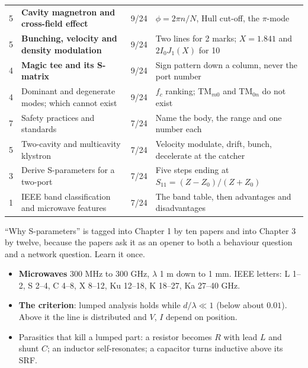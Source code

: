 \begin{tabularx}{\textwidth}{@{}L{0.7cm}L{5.5cm}L{1.3cm}X@{}}
5 & \textbf{Cavity magnetron and cross-field effect} & 9/24 & $\phi = 2\pi n/N$, Hull cut-off, the $\pi$-mode \\
5 & \textbf{Bunching, velocity and density modulation} & 9/24 & Two lines for 2 marks; $X=1.841$ and $2I_0J_1(X)$ for 10 \\
4 & \textbf{Magic tee and its S-matrix} & 9/24 & Sign pattern down a column, never the port number \\
4 & Dominant and degenerate modes; which cannot exist & 9/24 & $f_c$ ranking; TM$_{m0}$ and TM$_{0n}$ do not exist \\
7 & Safety practices and standards & 7/24 & Name the body, the range and one number each \\
5 & Two-cavity and multicavity klystron & 7/24 & Velocity modulate, drift, bunch, decelerate at the catcher \\
3 & Derive S-parameters for a two-port & 7/24 & Five steps ending at $S_{11}=(Z-Z_0)/(Z+Z_0)$ \\
1 & IEEE band classification and microwave features & 7/24 & The band table, then advantages and disadvantages \\
\bottomrule
\end{tabularx}

\vspace{2pt}
{\footnotesize\color{sub}  ``Why S-parameters''
is tagged into Chapter 1 by ten papers and into Chapter 3 by twelve, because the papers
ask it as an opener to both a behaviour question and a network question. Learn it once.}

\par{}\vspace{4pt}


\begin{itemize}
  \item \textbf{Microwaves} 300 MHz to 300 GHz, $\lambda$ 1 m down to 1 mm. IEEE letters:
    L 1--2, S 2--4, C 4--8, X 8--12, Ku 12--18, K 18--27, Ka 27--40 GHz.
  \item \textbf{The criterion}: lumped analysis holds while $d/\lambda \ll 1$ (below about
    $0.01$). Above it the line is distributed and $V$, $I$ depend on position.
  \item Parasitics that kill a lumped part: a resistor becomes $R$ with lead $L$ and shunt
    $C$; an inductor self-resonates; a capacitor turns inductive above its SRF.
\end{itemize}

